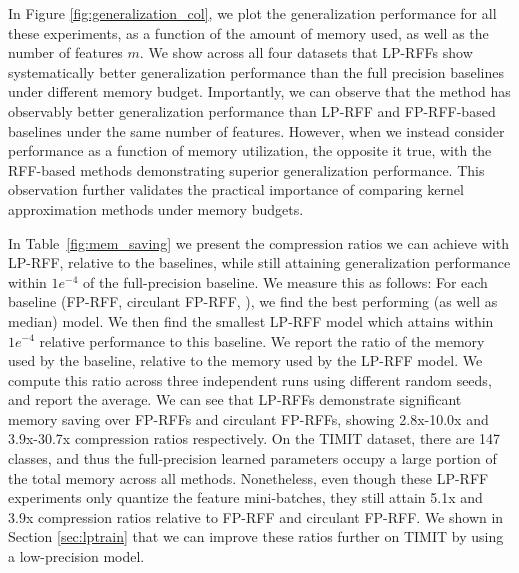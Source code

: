 In Figure \ref{fig:generalization_col}, we plot the generalization performance for all these experiments, as a function of the amount of memory used, as well as the number of features $m$. We show across all four datasets that LP-RFFs show systematically better generalization performance than the full precision baselines under different memory budget. Importantly, we can observe that the \Nystrom method has observably better generalization performance than LP-RFF and FP-RFF-based baselines under the same number of features. However, when we instead consider performance as a function of memory utilization, the opposite it true, with the RFF-based methods demonstrating superior generalization performance. This observation further validates the practical importance of comparing kernel approximation methods under memory budgets.

In Table~\ref{fig:mem_saving} we present the compression ratios we can achieve with LP-RFF, relative to the baselines, while still attaining generalization performance within $1e^{-4}$ of the full-precision baseline.  We measure this as follows:  For each baseline (FP-RFF, circulant FP-RFF, \Nystrom), we find the best performing (as well as median) model.  We then find the smallest LP-RFF model which attains within $1e^{-4}$ relative performance to this baseline.  We report the ratio of the memory used by the baseline, relative to the memory used by the LP-RFF model.  We compute this ratio across three independent runs using different random seeds, and report the average.  We can see that LP-RFFs demonstrate significant memory saving over FP-RFFs and circulant FP-RFFs, showing 2.8x-10.0x and 3.9x-30.7x compression ratios respectively. On the TIMIT dataset, there are 147 classes, and thus the full-precision learned parameters occupy a large portion of the total memory across all methods. Nonetheless, even though these LP-RFF experiments only quantize the feature mini-batches, they still attain 5.1x and 3.9x compression ratios relative to FP-RFF and circulant FP-RFF.  We shown in Section \ref{sec:lptrain} that we can improve these ratios further on TIMIT by using a low-precision model.

